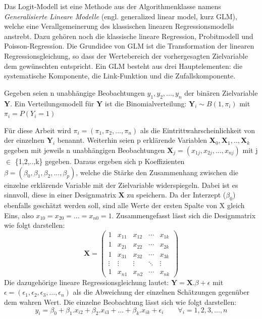 \documentclass[12pt,]{article}
\begin{document}
Das Logit-Modell ist eine Methode aus der Algorithmenklasse namens
\emph{Generalisierte Lineare Modelle} (engl. generalized linear model,
kurz GLM), welche eine Verallgemeinerung des klassischen linearen
Regressionsmodells anstrebt. Dazu gehören noch die klassische lineare
Regression, Probitmodell und Poisson-Regression. Die Grundidee von GLM
ist die Transformation der linearen Regressionsgleichung, so dass der
Wertebereich der vorhergesagten Zielvariable dem gewünschten entspricht.
Ein GLM besteht aus drei Hauptelementen: die systematische Komponente,
die Link-Funktion und die Zufallskomponente.

Gegeben seien n unabhängige Beobachtungen \(y_1, y_2, ...,y_n\) der
binären Zielvariable \(\mathbf{Y}\). Ein Verteilungsmodell für
\(\mathbf{Y}\) ist die Binomialverteilung:
\(\mathbf{Y}_i \sim B(1, \pi_i)\) mit \(\pi_i = P(Y_i = 1)\)

Für diese Arbeit wird \(\pi_i = (\pi_1, \pi_2, ..., \pi_n)\) als die
Eintrittwahrscheinlichkeit von der einzelnen \(\mathbf{Y}_i\) benannt.
Weiterhin seien p erklärende Variablen
\(\mathbf{X}_0,\mathbf{X}_1,..,\mathbf{X}_k\) gegeben mit jeweils n
unabhängigen Beobachtungen
\(\mathbf{X}_j = (x_{1j}, x_{2j},..., x_{nj})\) mit j \(\in\)
\{1,2,..,k\} gegeben. Daraus ergeben sich p Koeffizienten
\(\beta = (\beta_0, \beta_1, \beta_2,..., \beta_p)\), welche die Stärke
den Zusammenhang zwischen die einzelne erklärende Variable mit der
Zielvariable widerspiegeln. Dabei ist es sinnvoll, diese in einer
Designmatrix \(\mathbf{X}\) zu speichern. Da der Interzept (\(\beta_0\))
ebenfalls geschätzt werden soll, sind alle Werte der ersten Spalte von X
gleich Eins, also \(x_{10} = x_{20} = ... = x_{n0} = 1\).
Zusammengefasst lässt sich die Designmatrix wie folgt darstellen: \[
\mathbf{X} =
 \begin{pmatrix}
    1 & x_{11} & x_{12} & \cdots & x_{1k} \\
    1 & x_{21} & x_{22} & \cdots & x_{2k} \\
    1 & x_{31} & x_{32} & \cdots & x_{3k} \\
    \vdots  & \vdots  & \vdots & \ddots & \vdots \\
    1 & x_{n1} & x_{n2} & \cdots & x_{nk}
 \end{pmatrix}
\] Die dazugehörige lineare Regressionsgleichung lautet:
\(\mathbf{Y} = \mathbf{X}.\beta + \epsilon\) mit
\(\epsilon = (\epsilon_1, \epsilon_2, \epsilon_3, ..., \epsilon_n)\) als
die Abweichung der einzelnen Schätzungen gegenüber dem wahren Wert. Die
einzelne Beobachtung lässt sich wie folgt darstellen:
\[y_i = \beta_0 + \beta_1.x_{i2} + \beta_2.x_{i3} + ... + \beta_k.x_{ik} + \epsilon_i \qquad \forall_i = 1,2,3,...,n\]
\end{document}
